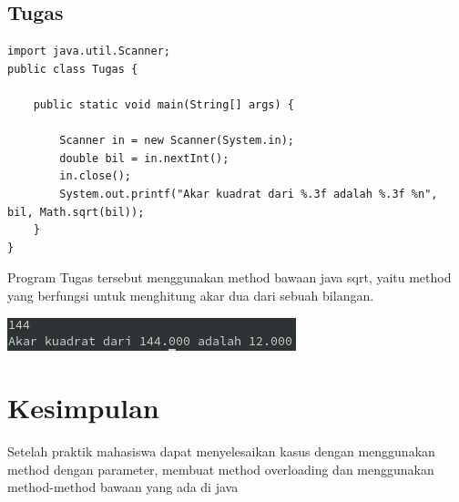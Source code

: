 \documentclass[a4paper,12pt]{article}
\begin{document}
\subsection{Tugas}
\begin{lstlisting}
import java.util.Scanner;
public class Tugas {

    public static void main(String[] args) {

        Scanner in = new Scanner(System.in);
        double bil = in.nextInt();
        in.close();
        System.out.printf("Akar kuadrat dari %.3f adalah %.3f %n", bil, Math.sqrt(bil));
    }
}
\end{lstlisting}
Program Tugas tersebut menggunakan method bawaan java sqrt, yaitu method yang berfungsi untuk menghitung akar dua dari
sebuah bilangan.

\begin{center}
    \includegraphics[scale=1]{7.png} 
\end{center}


\newpage

\section{Kesimpulan}
Setelah praktik mahasiswa dapat menyelesaikan kasus dengan menggunakan method dengan parameter, membuat method overloading dan
menggunakan method-method bawaan yang ada di java
\end{document}
